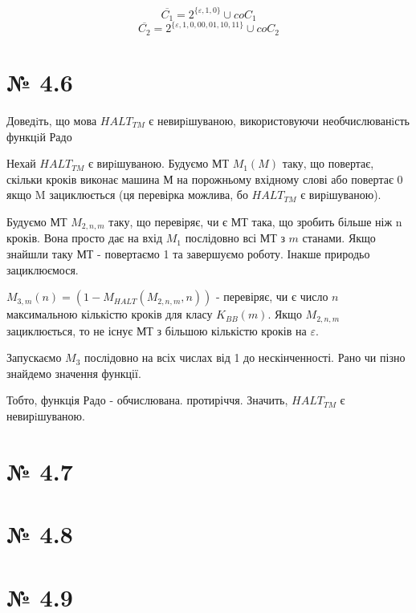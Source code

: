 \documentclass[11pt, a4paper]{article} %
\begin{document}
$$\overline{C_1} = 2^{\{\varepsilon, 1, 0\}} \cup coC_1$$
$$\overline{C_2} = 2^{\{\varepsilon, 1, 0, 00, 01, 10, 11\}} \cup coC_2$$

\section*{№ 4.6}
\begin{mdframed}
    Доведiть, що мова $HALT_{TM}$ є невирiшуваною, використовуючи
необчислюванiсть функцiй Радо
\end{mdframed}

Нехай $HALT_{TM}$ є вирiшуваною. 
Будуємо МТ $M_{1}(M)$ таку, що повертає, скільки кроків виконає машина М на порожньому вхідному слові
або повертає 0 якщо M зациклюється (ця перевірка можлива, бо $HALT_{TM}$ є вирiшуваною).

Будуємо МТ $M_{2,n,m}$ таку, що перевіряє, чи є МТ така, що зробить більше ніж n кроків.
Вона просто дає на вхід $M_1$ послідовно всі МТ з $m$ станами. 
Якщо знайшли таку МТ - повертаємо 1 та завершуємо роботу. Інакше природьо зациклюємося.

$M_{3,m}(n) = (1-M_{HALT}(M_{2,n,m}, n))$ - перевіряє, чи є число $n$ максимальною кількістю кроків для класу $K_{BB}(m)$.
Якщо $M_{2,n,m}$ зациклюється, то не існує МТ з більшою кількістю кроків на $\varepsilon$.

Запускаємо $M_3$ послідовно на всіх числах від 1 до нескінченності.
Рано чи пізно знайдемо значення функції.

Тобто, функція Радо - обчислювана. протиріччя. Значить, $HALT_{TM}$ є невирiшуваною.

\section*{№ 4.7}

\section*{№ 4.8}

    





\section*{№ 4.9}
\end{document}
